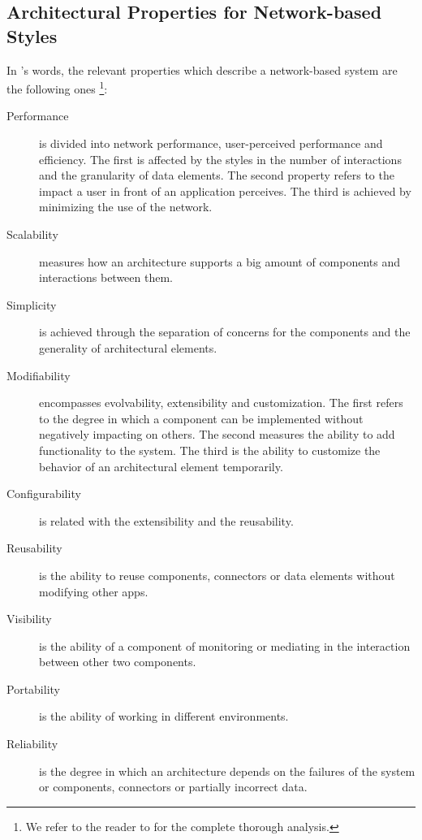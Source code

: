 



\subsection{Architectural Properties for Network-based Styles}
\label{sec:network_properties}




In \citeauthor{fielding_architectural_2000}'s words, the relevant properties which describe a network-based system are the following ones \footnote{We refer to the reader to \citet{fielding_architectural_2000} for the complete thorough analysis.}:
\begin{description}
  \item[Performance] is divided into network performance, user-perceived performance and efficiency.
		    The first is affected by the styles in the number of interactions and the granularity of data elements.
		    The second property refers to the impact a user in front of an application perceives.
		    The third is achieved by minimizing the use of the network.
  \item[Scalability] measures how an architecture supports a big amount of components and interactions between them.
  \item[Simplicity] is achieved through the separation of concerns for the components and the generality of architectural elements.
  \item[Modifiability] encompasses evolvability, extensibility and customization.
		      The first refers to the degree in which a component can be implemented without negatively impacting on others.
		      The second measures the ability to add functionality to the system.
		      The third is the ability to customize the behavior of an architectural element temporarily.
  \item[Configurability] is related with the extensibility and the reusability.
  \item[Reusability] is the ability to reuse components, connectors or data elements without modifying other apps.
  \item[Visibility] is the ability of a component of monitoring or mediating in the interaction between other two components.
  \item[Portability] is the ability of working in different environments.
  \item[Reliability] is the degree in which an architecture depends on the failures of the system or components, connectors or partially incorrect data.
\end{description}

